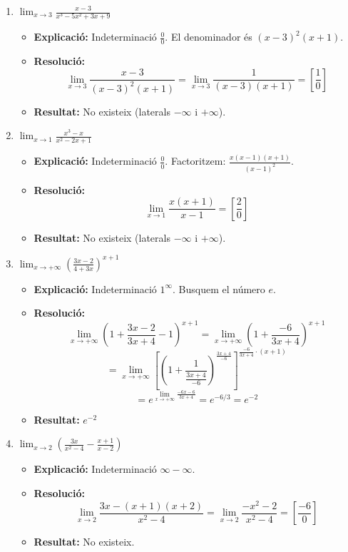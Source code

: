 \documentclass[12pt,a4paper]{article}
\begin{document}
\begin{enumerate}[label=\textbf{7.\arabic*.}]
    \item $\lim_{x \to 3} \frac{x-3}{x^3-5x^2+3x+9}$
        \begin{itemize}
            \item \textbf{Explicació:} Indeterminació $\frac{0}{0}$. El denominador és $(x-3)^2(x+1)$.
            \item \textbf{Resolució:}
            $$ \lim_{x \to 3} \frac{x-3}{(x-3)^2(x+1)} = \lim_{x \to 3} \frac{1}{(x-3)(x+1)} = \left[ \frac{1}{0} \right] $$
            \item \textbf{Resultat:} No existeix (laterals $-\infty$ i $+\infty$).
        \end{itemize}

    \item $\lim_{x \to 1} \frac{x^3-x}{x^2-2x+1}$
        \begin{itemize}
            \item \textbf{Explicació:} Indeterminació $\frac{0}{0}$. Factoritzem: $\frac{x(x-1)(x+1)}{(x-1)^2}$.
            \item \textbf{Resolució:}
            $$ \lim_{x \to 1} \frac{x(x+1)}{x-1} = \left[ \frac{2}{0} \right] $$
            \item \textbf{Resultat:} No existeix (laterals $-\infty$ i $+\infty$).
        \end{itemize}

    \item $\lim_{x \to +\infty} \left( \frac{3x-2}{4+3x} \right)^{x+1}$
        \begin{itemize}
            \item \textbf{Explicació:} Indeterminació $1^\infty$. Busquem el número $e$.
            \item \textbf{Resolució:}
            $$ \lim_{x \to +\infty} \left( 1 + \frac{3x-2}{3x+4} - 1 \right)^{x+1} = \lim_{x \to +\infty} \left( 1 + \frac{-6}{3x+4} \right)^{x+1} $$
            $$ = \lim_{x \to +\infty} \left[ \left( 1 + \frac{1}{\frac{3x+4}{-6}} \right)^{\frac{3x+4}{-6}} \right]^{\frac{-6}{3x+4} \cdot (x+1)} $$
            $$ = e^{\lim_{x \to +\infty} \frac{-6x-6}{3x+4}} = e^{-6/3} = e^{-2} $$
            \item \textbf{Resultat:} $e^{-2}$
        \end{itemize}

    \item $\lim_{x \to 2} \left( \frac{3x}{x^2-4} - \frac{x+1}{x-2} \right)$
        \begin{itemize}
            \item \textbf{Explicació:} Indeterminació $\infty - \infty$.
            \item \textbf{Resolució:}
            $$ \lim_{x \to 2} \frac{3x - (x+1)(x+2)}{x^2-4} = \lim_{x \to 2} \frac{-x^2-2}{x^2-4} = \left[ \frac{-6}{0} \right] $$
            \item \textbf{Resultat:} No existeix.
        \end{itemize}


\end{enumerate}
\end{document}
